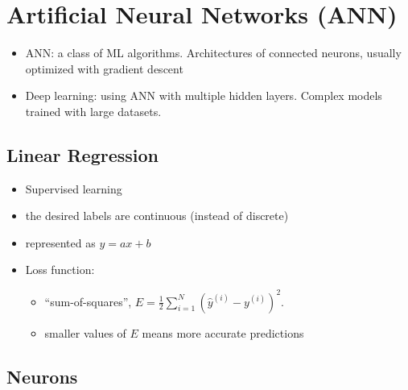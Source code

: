 \documentclass[twocolumn,landscape,10pt]{article}
\theoremstyle{definition}
\begin{document}
\section{Artificial Neural Networks (ANN)}

\begin{itemize}
    \item ANN: a class of ML algorithms. Architectures of connected neurons,
        usually optimized with gradient descent
    \item Deep learning: using ANN with multiple hidden layers. Complex models
        trained with large datasets.
\end{itemize} 

\subsection{Linear Regression}

\begin{itemize}
    \item Supervised learning
    \item the desired labels are continuous (instead of discrete)
    \item represented as $y = ax + b$
    \item Loss function: 
        \begin{itemize}
            \item 
                ``sum-of-squares'', $E=\frac{1}{2}\sum_{i=1}^{N}
                {\left(\hat{y}^{(i)}-y^{(i)}\right)}^{2}$.
            \item 
                smaller values of $E$ means more accurate predictions
        \end{itemize} 
\end{itemize} 

\subsection{Neurons}
\end{document}
